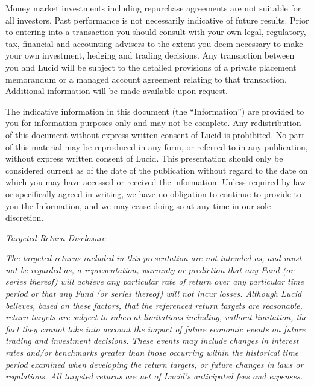 \documentclass[9pt]{article}
\begin{document}
\noindent Money market investments including repurchase agreements are not suitable for all investors. Past performance is not necessarily indicative of future results.  Prior to entering into a transaction you should consult with your own legal, regulatory, tax, financial and accounting advisers to the extent you deem necessary to make your own investment, hedging and trading decisions. Any transaction between you and Lucid will be subject to the detailed provisions of a private placement memorandum or a managed account agreement relating to that transaction. Additional information will be made available upon request.

\noindent The indicative information in this document (the ``Information'') are provided to you for information purposes only and may not be complete. Any redistribution of this document without express written consent of Lucid is prohibited.  No part of this material may be reproduced in any form, or referred to in any publication, without express written consent of Lucid.  This presentation should only be considered current as of the date of the publication without regard to the date on which you may have accessed or received the information. Unless required by law or specifically agreed in writing, we have no obligation to continue to provide to you the Information, and we may cease doing so at any time in our sole discretion.

\noindent\underline{\textit{Targeted Return Disclosure}}

\noindent\textit{The targeted returns included in this presentation are not intended as, and must not be regarded as, a representation, warranty or prediction that any Fund (or series thereof) will achieve any particular rate of return over any particular time period or that any Fund (or series thereof) will not incur losses. Although Lucid believes, based on these factors, that the referenced return targets are reasonable, return targets are subject to inherent limitations including, without limitation, the fact they cannot take into account the impact of future economic events on future trading and investment decisions. These events may include changes in interest rates and/or benchmarks greater than those occurring within the historical time period examined when developing the return targets, or future changes in laws or regulations. All targeted returns are net of Lucid's anticipated fees and expenses.}
\end{document}
